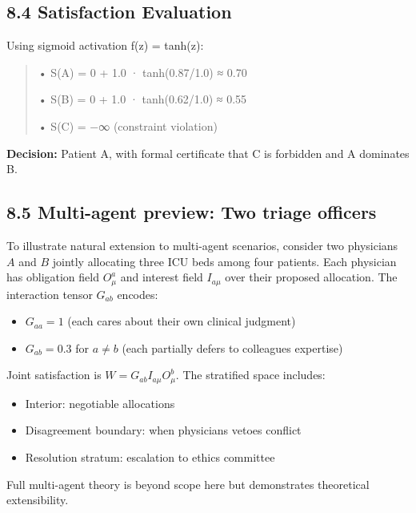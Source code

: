 \documentclass[12pt]{article}
\theoremstyle{plain}
\theoremstyle{definition}
\theoremstyle{remark}
\begin{document}
\subsection{8.4 Satisfaction
Evaluation}\label{satisfaction-evaluation-1}

Using sigmoid activation f(z) = tanh(z):

\begin{quote}
• S(A) = 0 + 1.0 · tanh(0.87/1.0) ≈ 0.70

• S(B) = 0 + 1.0 · tanh(0.62/1.0) ≈ 0.55

• S(C) = −∞ (constraint violation)
\end{quote}

\textbf{Decision:} Patient A, with formal certificate that C is
forbidden and A dominates B.

\subsection{8.5 Multi-agent preview: Two triage
officers}\label{multi-agent-preview-two-triage-officers}

To illustrate natural extension to multi-agent scenarios, consider two
physicians \(A\) and \(B\) jointly allocating three ICU beds among four
patients. Each physician has obligation field \(O_{\mu}^{a}\) and
interest field \(I_{a\mu}\) over their proposed allocation. The
interaction tensor \(G_{ab}\) encodes:

\begin{itemize}
\item
  \(G_{aa} = 1\) (each cares about their own clinical judgment)
\item
  \(G_{ab} = 0.3\) for \(a \neq b\) (each partially defers to
  colleague\textquotesingle s expertise)
\end{itemize}

Joint satisfaction is \(W = G_{ab}I_{a\mu}O_{\mu}^{b}\). The stratified
space includes:

\begin{itemize}
\item
  Interior: negotiable allocations
\item
  Disagreement boundary: when physicians\textquotesingle{} vetoes
  conflict
\item
  Resolution stratum: escalation to ethics committee
\end{itemize}

Full multi-agent theory is beyond scope here but demonstrates
theoretical extensibility.
\end{document}
